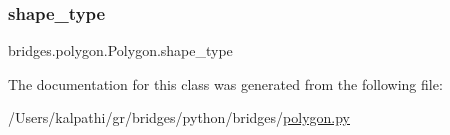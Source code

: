 \subsubsection{\texorpdfstring{shape\_type}{shape\_type}}
{\footnotesize\ttfamily bridges.\+polygon.\+Polygon.\+shape\+\_\+type}



The documentation for this class was generated from the following file\+:\begin{DoxyCompactItemize}
\item 
/\+Users/kalpathi/gr/bridges/python/bridges/\mbox{\hyperlink{polygon_8py}{polygon.\+py}}\end{DoxyCompactItemize}
